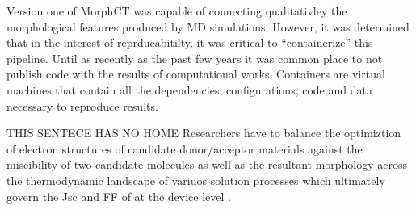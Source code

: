 Version one of MorphCT was capable of
connecting qualitativley the morphological features produced by MD simulations. However, it was determined
that in the interest of reprducabitilty, it was critical to ``containerize'' this pipeline. Until as recently as
the past few years it was common place to not publish code with the results of computational works. Containers
are virtual machines that contain all the dependencies, configurations, code and data necessary to reproduce
results. \cite{Cito2016a}

THIS SENTECE HAS NO HOME Researchers have to
balance the optimiztion of electron structures of candidate donor/acceptor materials against the miscibility
of two candidate molecules as well as the resultant morphology across the thermodynamic landscape of
variuos solution processes which ultimately govern the Jsc and FF of at the device level \cite{Zhu2020a}. 
